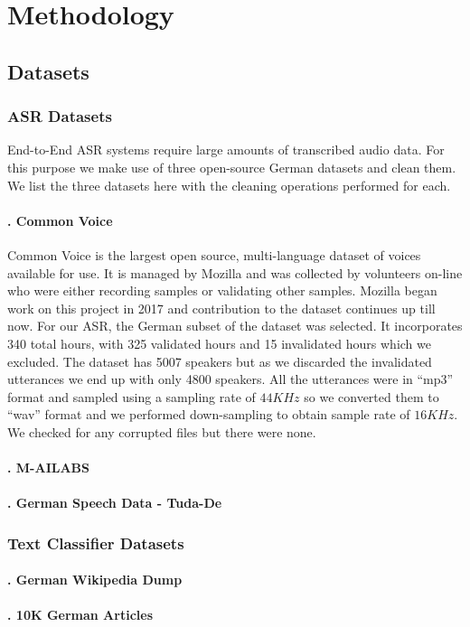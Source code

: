\chapter{Methodology}
\label{chap:methodology}


\section{Datasets} 
\label{meth:s1}


\subsection{\ac{ASR} Datasets}
\label{meth:sub1}

End-to-End \ac{ASR} systems require large amounts of transcribed audio data. For this purpose we make use of three open-source German datasets and clean them. We list the three datasets here with the cleaning operations performed for each.


\subsubsection{. Common Voice}
\label{meth:subsubsub1}

Common Voice is the largest open source, multi-language dataset of voices available for use. It is managed by Mozilla and was collected by volunteers on-line who were either recording samples or validating other samples. Mozilla began work on this project in 2017 and contribution to the dataset continues up till now. 
For our \ac{ASR}, the German subset of the dataset was selected. It incorporates 340 total hours, with 325 validated hours and 15 invalidated hours which we excluded. The dataset has 5007 speakers but as we discarded the invalidated utterances we end up with only 4800 speakers. 
All the utterances were in \enquote{mp3} format and sampled using a sampling rate of $44 KHz$ so we converted them to \enquote{wav} format and we performed down-sampling to obtain sample rate of $16 KHz$. We checked for any corrupted files but there were none.


\subsubsection{. M-AILABS}
\label{meth:subsub2}

\subsubsection{. German Speech Data - Tuda-De}
\label{meth:subsub3}



\subsection{Text Classifier Datasets}
\label{meth:sub2}

\subsubsection{. German Wikipedia Dump}
\label{meth:subsub4}
\subsubsection{. 10K German Articles}
\label{meth:subsub5}